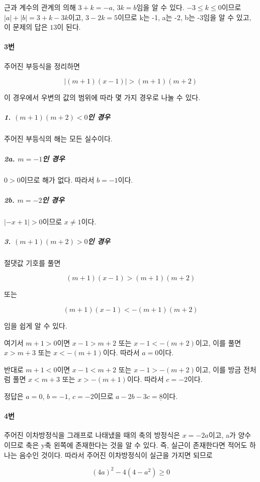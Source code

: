 \documentclass{article}
\begin{document}
근과 계수의 관계의 의해 $3 + k = -a$, $3k = b$임을 알 수 있다. $-3 \le k \le 0$이므로 $\lvert a \rvert + \lvert b \rvert = 3 + k - 3k$이고, $3 - 2k = 5$이므로 k는 -1, a는 -2, b는 -3임을 알 수 있고, 이 문제의 답은 \underline{$13$}이 된다.

\paragraph{3번}

주어진 부등식을 정리하면

$$
\lvert (m + 1)(x - 1) \rvert > (m + 1)(m + 2)
$$

이 경우에서 우변의 값의 범위에 따라 몇 가지 경우로 나눌 수 있다.

\subparagraph{1. $(m + 1)(m + 2) < 0$인 경우}
주어진 부등식의 해는 모든 실수이다.

\subparagraph{2a. $m = -1$인 경우}
$0 > 0$이므로 해가 없다. 따라서 $b = -1$이다.

\subparagraph{2b. $m = -2$인 경우}
$\lvert -x + 1 \rvert > 0$이므로 $x \ne 1$이다.

\subparagraph{3. $(m + 1)(m + 2) > 0$인 경우}
절댓값 기호를 풀면

$$
(m + 1)(x - 1) > (m + 1)(m + 2)
$$

또는

$$
(m + 1)(x - 1) < -(m + 1)(m + 2)
$$

임을 쉽게 알 수 있다. \newline

여기서 $m + 1 > 0$이면 $x - 1 > m + 2$ 또는 $x - 1 < -(m + 2)$이고, 이를 풀면 $x > m + 3$ 또는 $x < -(m + 1)$이다. 따라서 $a = 0$이다. \newline

반대로 $m + 1 < 0$이면 $x - 1 < m + 2$ 또는 $x - 1 > -(m + 2)$이고, 이를 방금 전처럼 풀면 $x < m + 3$ 또는 $x > -(m + 1)$이다. 따라서 $c = -2$이다. \newline

정답은 $a = 0$, $b = -1$, $c = -2$이므로 $a - 2b - 3c = \underline{8}$이다.

\paragraph{4번}
주어진 이차방정식을 그래프로 나태냈을 때의 축의 방정식은 $x = -2a$이고, a가 양수이므로 축은 y축 왼쪽에 존재한다는 것을 알 수 있다. 즉, 실근이 존재한다면 적어도 하나는 음수인 것이다. 따라서 주어진 이차방정식이 실근을 가지면 되므로

$$
(4a)^2 - 4(4 - a^2) \ge 0
$$
\end{document}
